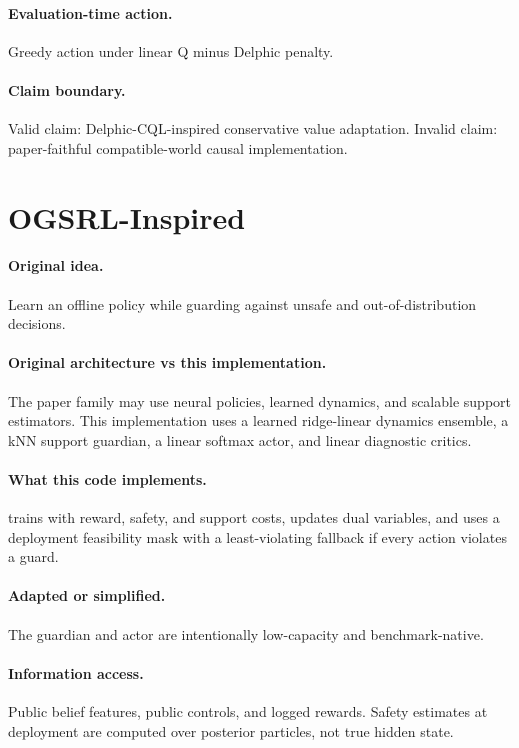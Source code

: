 \documentclass[11pt]{article}
\begin{document}
\paragraph{Evaluation-time action.}
Greedy action under linear Q minus Delphic penalty.

\paragraph{Claim boundary.}
Valid claim: Delphic-CQL-inspired conservative value adaptation. Invalid claim:
paper-faithful compatible-world causal implementation.

\section{OGSRL-Inspired}

\paragraph{Original idea.}
Learn an offline policy while guarding against unsafe and out-of-distribution
decisions.

\paragraph{Original architecture vs this implementation.}
The paper family may use neural policies, learned dynamics, and scalable support
estimators. This implementation uses a learned ridge-linear dynamics ensemble, a
kNN support guardian, a linear softmax actor, and linear diagnostic critics.

\paragraph{What this code implements.}
 trains with reward, safety, and support costs, updates dual
variables, and uses a deployment feasibility mask with a least-violating
fallback if every action violates a guard.

\paragraph{Adapted or simplified.}
The guardian and actor are intentionally low-capacity and benchmark-native.

\paragraph{Information access.}
Public belief features, public controls, and logged rewards. Safety estimates at
deployment are computed over posterior particles, not true hidden state.
\end{document}
